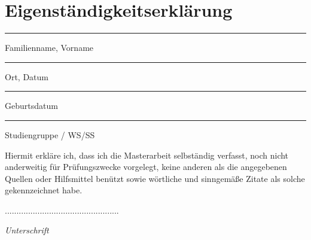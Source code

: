 \chapter*{Eigenständigkeitserklärung}

\thispagestyle{empty}

\vspace{2cm}

\parbox{5cm}{\centering\hrule\medskip Familienname, Vorname}
\vspace{3cm}
\hfill
\parbox{5cm}{\centering\hrule\medskip Ort, Datum}

\vspace{-1cm}

\parbox{5cm}{\centering\hrule\medskip Geburtsdatum}
\vspace{3cm}
\hfill
\parbox{5cm}{\centering\hrule\medskip Studiengruppe / WS/SS}





\vspace{.5cm}

\flushleft

Hiermit erkläre ich, dass ich die Masterarbeit selbständig verfasst, noch nicht anderweitig
für Prüfungszwecke vorgelegt, keine anderen als die angegebenen Quellen oder Hilfsmittel
benützt sowie wörtliche und sinngemäße Zitate als solche gekennzeichnet habe.

\vspace{20mm}
\begin{flushright}
.................................................

\textit{Unterschrift}

\end{flushright}

												